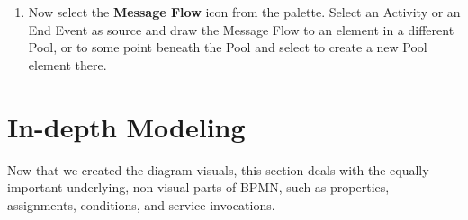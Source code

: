 \begin{enumerate}
	\item Now select the \textbf{Message Flow} icon from the palette.  Select an
	Activity or an End Event as source and draw the Message Flow to an element in
	a different Pool, or to some point beneath the Pool and select to create a
	new Pool element there.
		
	
\end{enumerate}



\section{In-depth Modeling}

Now that we created the diagram visuals, this section deals with the equally
important underlying, non-visual parts of BPMN, such as properties, assignments,
conditions, and service invocations.

